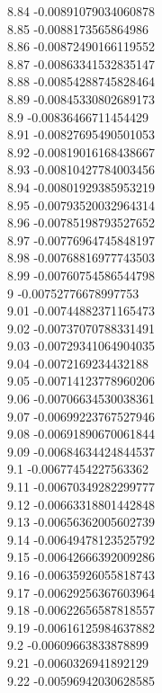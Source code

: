 {8.84	-0.00891079034060878\\
8.85	-0.0088173565864986\\
8.86	-0.00872490166119552\\
8.87	-0.00863341532835147\\
8.88	-0.00854288745828464\\
8.89	-0.00845330802689173\\
8.9	-0.00836466711454429\\
8.91	-0.00827695490501053\\
8.92	-0.00819016168438667\\
8.93	-0.00810427784003456\\
8.94	-0.00801929385953219\\
8.95	-0.00793520032964314\\
8.96	-0.00785198793527652\\
8.97	-0.00776964745848197\\
8.98	-0.00768816977743503\\
8.99	-0.00760754586544798\\
9	-0.00752776678997753\\
9.01	-0.00744882371165473\\
9.02	-0.00737070788331491\\
9.03	-0.00729341064904035\\
9.04	-0.0072169234432188\\
9.05	-0.00714123778960206\\
9.06	-0.00706634530038361\\
9.07	-0.00699223767527946\\
9.08	-0.00691890670061844\\
9.09	-0.00684634424844537\\
9.1	-0.00677454227563362\\
9.11	-0.00670349282299777\\
9.12	-0.00663318801442848\\
9.13	-0.00656362005602739\\
9.14	-0.00649478123525792\\
9.15	-0.00642666392009286\\
9.16	-0.00635926055818743\\
9.17	-0.00629256367603964\\
9.18	-0.00622656587818557\\
9.19	-0.00616125984637882\\
9.2	-0.00609663833878899\\
9.21	-0.0060326941892129\\
9.22	-0.00596942030628585\\
}
